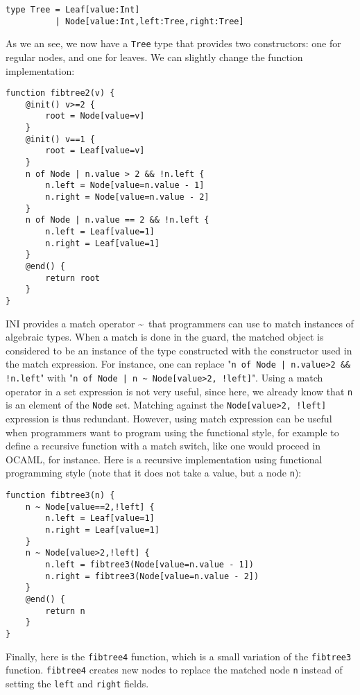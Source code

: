 \documentclass[11pt]{article}
\begin{document}
\begin{lstlisting}[numbers=none]
type Tree = Leaf[value:Int]
          | Node[value:Int,left:Tree,right:Tree]
\end{lstlisting}

As we an see, we now have a \texttt{Tree} type that provides two constructors: one for regular nodes, and one for leaves. We can slightly change the function implementation:

\begin{lstlisting}
function fibtree2(v) {
	@init() v>=2 {
		root = Node[value=v]
	}
	@init() v==1 {
		root = Leaf[value=v]
	}
	n of Node | n.value > 2 && !n.left {
		n.left = Node[value=n.value - 1]
		n.right = Node[value=n.value - 2]
	}
	n of Node | n.value == 2 && !n.left {
		n.left = Leaf[value=1]
		n.right = Leaf[value=1]
	}
	@end() {
		return root
	}
}
\end{lstlisting}

INI provides a match operator \~~that programmers can use to match instances of algebraic types. When a match is done in the guard, the matched object is considered to be an instance of the type constructed with the constructor used in the match expression. For instance, one can replace "\texttt{n of Node | n.value>2 \&\& !n.left}" with "\texttt{n of Node | n \~~Node[value>2, !left]}". Using a match operator in a set expression is not very useful, since here, we already know that \texttt{n} is an element of the \texttt{Node} set. Matching against the \texttt{Node[value>2, !left]} expression is thus redundant. However, using match expression can be useful when programmers want to program using the functional style, for example to define a recursive function with a match switch, like one would proceed in OCAML, for instance. Here is a recursive implementation using functional programming style (note that it does not take a value, but a node \texttt{n}):

\begin{lstlisting}
function fibtree3(n) {
	n ~ Node[value==2,!left] {
		n.left = Leaf[value=1]
		n.right = Leaf[value=1]
	}
	n ~ Node[value>2,!left] {
		n.left = fibtree3(Node[value=n.value - 1])
		n.right = fibtree3(Node[value=n.value - 2])
	}
	@end() {
		return n
	}
}
\end{lstlisting}

Finally, here is the \texttt{fibtree4} function, which is a small variation of the \texttt{fibtree3} function. \texttt{fibtree4} creates new nodes to replace the matched node \texttt{n} instead of setting the \texttt{left} and \texttt{right} fields.
\end{document}
